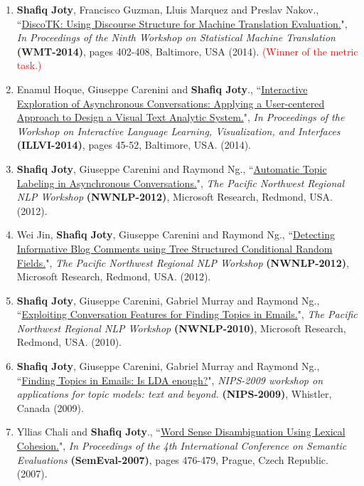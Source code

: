 \documentclass[paper=letter,fontsize=11pt]{scrartcl} %
\newcommand{\PaperEntry}[7]{
		\noindent #1, ``\href{#7}{#2}", \textit{#3} \textbf{#4}, #5 (#6).}
\begin{document}
\begin{enumerate}
\item \PaperEntry{\textbf{Shafiq Joty}, Francisco Guzman, Lluis Marquez and Preslav Nakov.}{DiscoTK: Using Discourse Structure for Machine Translation Evaluation.}{In Proceedings of the Ninth Workshop on Statistical Machine Translation} {(WMT-2014)}{pages 402-408, Baltimore, USA}{2014}
{https://www.aclweb.org/anthology/W/W14/W14-3352.pdf}
\textcolor{red}{(Winner of the metric task.)}

\item \PaperEntry{Enamul Hoque, Giuseppe Carenini and \textbf{Shafiq Joty}.}{Interactive Exploration of Asynchronous Conversations: Applying a User-centered Approach to Design a Visual Text Analytic System.} {In Proceedings of the Workshop on Interactive Language Learning, Visualization, and Interfaces}{(ILLVI-2014)}{pages 45-52, Baltimore, USA.}{2014}
{http://nlp.stanford.edu/events/illvi2014/papers/hoque-illvi2014.pdf}

\item \PaperEntry{\textbf{Shafiq Joty}, Giuseppe Carenini and Raymond Ng.}{Automatic Topic Labeling in Asynchronous Conversations.} {The Pacific Northwest Regional NLP Workshop}{(NWNLP-2012)}{Microsoft Research, Redmond, USA.}{2012}
{http://dada.cs.washington.edu/nw-nlp-2012/papers/NWTopicLabel2012_Final.pdf}

\item \PaperEntry{Wei Jin, \textbf{Shafiq Joty}, Giuseppe Carenini and Raymond Ng.}{Detecting Informative Blog Comments using Tree Structured Conditional Random Fields.} {The Pacific Northwest Regional NLP Workshop}{(NWNLP-2012)}{Microsoft Research, Redmond, USA.}{2012}
{http://dada.cs.washington.edu/nw-nlp-2012/papers/Tree_CRF_CameraReady.pdf}

\item \PaperEntry{\textbf{Shafiq Joty}, Giuseppe Carenini, Gabriel Murray and Raymond Ng.}{Exploiting Conversation Features for Finding Topics in Emails.} {The Pacific Northwest Regional NLP Workshop}{(NWNLP-2010)}{Microsoft Research, Redmond, USA.}{2010}
{http://depts.washington.edu/uwcl/nw-nlp-2010/papers/JotyEtAl_Oral.pdf}

\item \PaperEntry{\textbf{Shafiq Joty}, Giuseppe Carenini, Gabriel Murray and Raymond Ng.}{Finding Topics in Emails: Is LDA enough?} {NIPS-2009 workshop on applications for topic models: text and beyond.}{(NIPS-2009)}{Whistler, Canada}{2009}
{http://depts.washington.edu/uwcl/nw-nlp-2010/papers/JotyEtAl_Oral.pdf}

\item \PaperEntry{Yllias Chali and \textbf{Shafiq Joty}.}{Word Sense Disambiguation Using Lexical Cohesion.} {In Proceedings of the 4th International Conference on Semantic Evaluations}{(SemEval-2007)}{pages 476-479, Prague, Czech Republic.}{2007}
{http://www.aclweb.org/anthology/S07-1106}

\end{enumerate}
\end{document}
